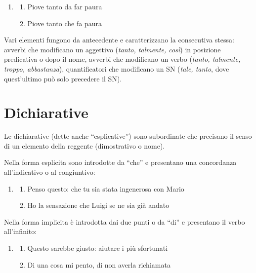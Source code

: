 \documentclass[
  a4paper,
  twoside,
  11pt,
  chapterprefix=false,
  bibliography=totocnumbered,
  listof=flat]{scrbook}
\providecommand{\tightlist}{%
  \setlength{\itemsep}{0pt}\setlength{\parskip}{0pt}}
\begin{document}
\begin{enumerate}
\def\labelenumi{(\arabic{enumi})}
\setcounter{enumi}{93}
\item
  \begin{enumerate}
  \def\labelenumii{\alph{enumii}.}
  \tightlist
  \item
    Piove tanto da far paura
  \item
    Piove tanto che fa paura
  \end{enumerate}
\end{enumerate}

Vari elementi fungono da antecedente e caratterizzano la consecutiva stessa: avverbi che modificano un aggettivo (\emph{tanto, talmente, così}) in posizione predicativa o dopo il nome, avverbi che modificano un verbo (\emph{tanto, talmente, troppo, abbastanza}), quantificatori che modificano un SN (\emph{tale, tanto}, dove quest'ultimo può solo precedere il SN).

\hypertarget{dichiarative}{%
\section{Dichiarative}\label{dichiarative}}

Le dichiarative (dette anche \enquote{esplicative}) sono subordinate che precisano il senso di un elemento della reggente (dimostrativo o nome).

Nella forma esplicita sono introdotte da \enquote{che} e presentano una concordanza all'indicativo o al congiuntivo:

\begin{enumerate}
\def\labelenumi{(\arabic{enumi})}
\setcounter{enumi}{94}
\item
  \begin{enumerate}
  \def\labelenumii{\alph{enumii}.}
  \tightlist
  \item
    Penso questo: che tu sia stata ingenerosa con Mario
  \item
    Ho la sensazione che Luigi se ne sia già andato
  \end{enumerate}
\end{enumerate}

Nella forma implicita è introdotta dai due punti o da \enquote{di} e presentano il verbo all'infinito:

\begin{enumerate}
\def\labelenumi{(\arabic{enumi})}
\setcounter{enumi}{95}
\item
  \begin{enumerate}
  \def\labelenumii{\alph{enumii}.}
  \tightlist
  \item
    Questo sarebbe giusto: aiutare i più sfortunati
  \item
    Di una cosa mi pento, di non averla richiamata
  \end{enumerate}
\end{enumerate}
\end{document}
